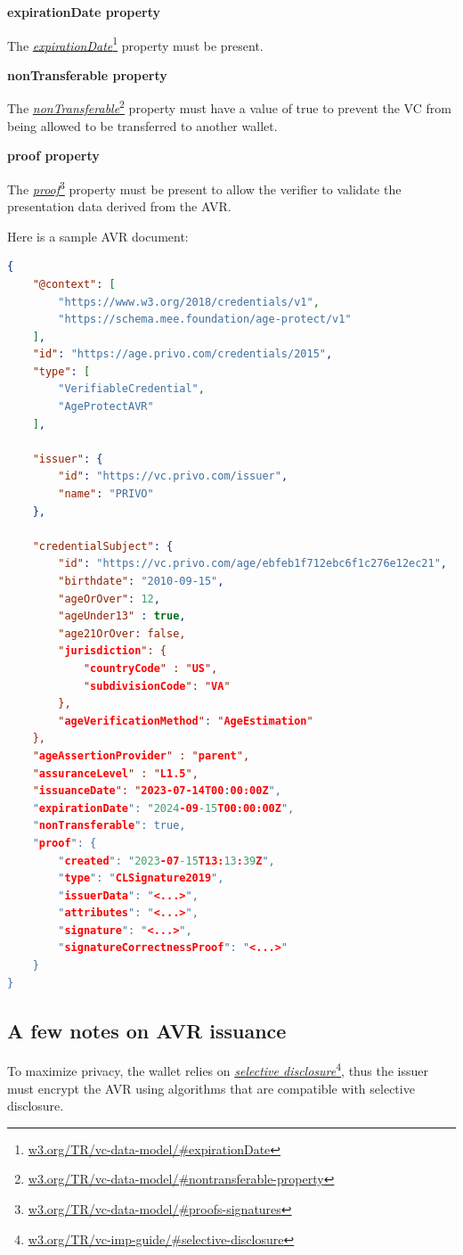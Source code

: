 \documentclass[11pt, oneside]{article}   	%
\newcommand{\hyperfootnote}[1][]{\def\ArgI{{#1}}\hyperfootnoteRelay}
\newcommand\hyperfootnoteRelay[2][]{\href{#1#2}{\ArgI}\footnote{\href{#1#2}{#2}}}
\begin{document}
\textbf{expirationDate property}

The \hyperfootnote[\emph{expirationDate}][https://]{w3.org/TR/vc-data-model/\#expirationDate} property must be present.

\textbf{nonTransferable property}

The \hyperfootnote[\emph{nonTransferable}][https://]{w3.org/TR/vc-data-model/\#nontransferable-property} property must have a value of true to prevent the VC from being allowed to be transferred to another wallet.

\textbf{proof property}

The \hyperfootnote[\emph{proof}][https://]{w3.org/TR/vc-data-model/\#proofs-signatures} property must be present to allow the verifier to validate the presentation data derived from the AVR.

Here is a sample AVR document:

\begin{lstlisting}[language=json,firstnumber=1]
{
	"@context": [
		"https://www.w3.org/2018/credentials/v1",
		"https://schema.mee.foundation/age-protect/v1"
	],
	"id": "https://age.privo.com/credentials/2015",
	"type": [
		"VerifiableCredential",
		"AgeProtectAVR"
	],

	"issuer": {
		"id": "https://vc.privo.com/issuer",
		"name": "PRIVO"
	},

	"credentialSubject": {
		"id": "https://vc.privo.com/age/ebfeb1f712ebc6f1c276e12ec21",
		"birthdate": "2010-09-15",
		"ageOrOver": 12,
		"ageUnder13" : true,
		"age21OrOver: false,
		"jurisdiction": {
			"countryCode" : "US",
			"subdivisionCode": "VA"
		},
		"ageVerificationMethod": "AgeEstimation"
	},
	"ageAssertionProvider" : "parent",
	"assuranceLevel" : "L1.5",
	"issuanceDate": "2023-07-14T00:00:00Z",
	"expirationDate": "2024-09-15T00:00:00Z",
	"nonTransferable": true,
	"proof": {
		"created": "2023-07-15T13:13:39Z",
		"type": "CLSignature2019",
		"issuerData": "<...>",
		"attributes": "<...>",
		"signature": "<...>",
		"signatureCorrectnessProof": "<...>"
	}
}
\end{lstlisting}

\subsection{A few notes on AVR issuance}

To maximize privacy, the wallet relies on \hyperfootnote[\emph{selective disclosure}][https://]{w3.org/TR/vc-imp-guide/\#selective-disclosure}, thus the issuer must encrypt the AVR using algorithms that are compatible with selective disclosure.
\end{document}
